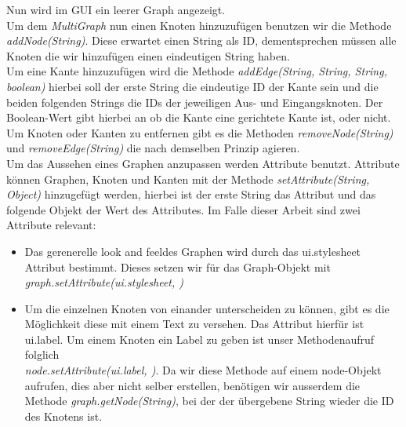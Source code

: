 Nun wird im GUI ein leerer Graph angezeigt.\\
Um dem \textit{MultiGraph} nun einen Knoten hinzuzufügen benutzen wir 
die Methode \textit{addNode(String)}. Diese erwartet einen String als ID,
dementsprechen müssen alle Knoten die wir hinzufügen einen eindeutigen
String haben.\\
Um eine Kante hinzuzufügen wird die Methode \textit{addEdge(String, String, String, boolean)}
hierbei soll der erste String die eindeutige ID der Kante sein und die beiden folgenden Strings
die IDs der jeweiligen Aus- und Eingangsknoten.
Der Boolean-Wert gibt hierbei an ob die Kante eine gerichtete Kante ist, oder nicht.
Um Knoten oder Kanten zu entfernen gibt es die Methoden \textit{removeNode(String)}
und \textit{removeEdge(String)} die nach demselben Prinzip agieren.\\

Um das Aussehen eines Graphen anzupassen werden Attribute benutzt\cite{GS_data}.
Attribute können Graphen, Knoten und Kanten mit der Methode \textit{setAttribute(String, Object)}
hinzugefügt werden, hierbei ist der erste String das Attribut und das folgende
Objekt der Wert des Attributes. Im Falle dieser Arbeit sind zwei Attribute relevant:
\begin{itemize}
  \item Das gerenerelle \glqq look and feel\grqq des Graphen wird durch das \glqq ui.stylesheet\grqq
    Attribut bestimmt. Dieses setzen wir für das Graph-Objekt mit\\
    \textit{graph.setAttribute(\glqq ui.stylesheet\grqq, \glqq [...]\grqq)}
  \item Um die einzelnen Knoten von einander unterscheiden zu können, gibt es
    die Möglichkeit diese mit einem Text zu versehen. Das Attribut hierfür ist
    \glqq ui.label\grqq . Um einem Knoten ein Label zu geben ist unser Methodenaufruf folglich\\
    \textit{node.setAttribute(\glqq ui.label\grqq, \glqq [...]\grqq)}. Da wir diese Methode auf einem 
    node-Objekt aufrufen, dies aber nicht selber erstellen, benötigen wir ausserdem
    die Methode \textit{graph.getNode(String)}, bei der der übergebene String
    wieder die ID des Knotens ist.
\end{itemize}


